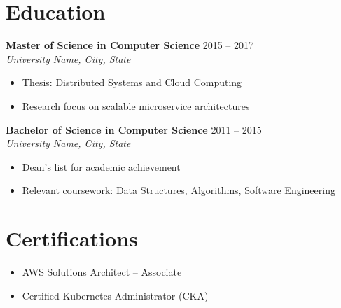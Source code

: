 \documentclass[10pt,A4]{article}
\begin{document}
\section*{Education}

\textbf{Master of Science in Computer Science} \hfill 2015 -- 2017\\
\textit{University Name, City, State}
\begin{itemize}
	\item Thesis: Distributed Systems and Cloud Computing
	\item Research focus on scalable microservice architectures
\end{itemize}

\textbf{Bachelor of Science in Computer Science} \hfill 2011 -- 2015\\
\textit{University Name, City, State}
\begin{itemize}
	\item Dean's list for academic achievement
	\item Relevant coursework: Data Structures, Algorithms, Software Engineering
\end{itemize}


\section*{Certifications}

\begin{itemize}
	\item AWS Solutions Architect -- Associate
	\item Certified Kubernetes Administrator (CKA)
\end{itemize}

%
%
\end{document}
